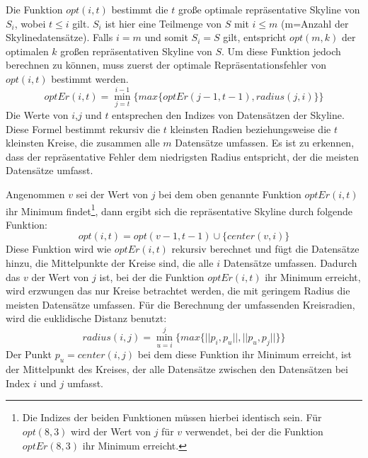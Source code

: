 Die Funktion $opt(i,t)$ bestimmt die $t$ große optimale repräsentative Skyline von $S_i$, wobei $t \leq i$ gilt. $S_i$ ist hier eine Teilmenge von $S$ mit $i \leq m$ (m=Anzahl der Skylinedatensätze). Falls $i=m$ und somit $S_i=S$ gilt, entspricht $opt(m,k)$ der optimalen $k$ großen repräsentativen Skyline von $S$.
Um diese Funktion jedoch berechnen zu können, muss zuerst der optimale Repräsentationsfehler von $opt(i,t)$ bestimmt werden.
$$optEr(i,t)=\min\limits_{j=t}^{i-1}\{max\{optEr(j-1,t-1),radius(j,i)\}\}$$
Die Werte von $i$,$j$ und $t$ entsprechen den Indizes von Datensätzen der Skyline. Diese Formel bestimmt rekursiv die $t$ kleinsten Radien beziehungsweise die $t$ kleinsten Kreise, die zusammen alle $m$ Datensätze umfassen. Es ist zu erkennen, dass der repräsentative Fehler dem niedrigsten Radius entspricht, der die meisten Datensätze umfasst.

Angenommen $v$ sei der Wert von $j$ bei dem oben genannte Funktion $optEr(i,t)$ ihr Minimum findet\footnote{Die Indizes der beiden Funktionen müssen hierbei identisch sein. Für $opt(8,3)$ wird der Wert von $j$ für $v$ verwendet, bei der die Funktion $optEr(8,3)$ ihr Minimum erreicht.}, dann ergibt sich die repräsentative Skyline durch folgende Funktion:
$$opt(i,t)=opt(v-1,t-1)\cup\{center(v,i)\}$$
Diese Funktion wird wie $optEr(i,t)$ rekursiv berechnet und fügt die Datensätze hinzu, die Mittelpunkte der Kreise sind, die alle $i$ Datensätze umfassen. Dadurch das $v$ der Wert von $j$ ist, bei der die Funktion $optEr(i,t)$ ihr Minimum erreicht, wird erzwungen das nur Kreise betrachtet werden, die mit geringem Radius die meisten Datensätze umfassen.   
Für die Berechnung der umfassenden Kreisradien, wird die euklidische Distanz benutzt:
$$radius(i,j)=\min\limits_{u=i}^{j}\{max\{||p_i,p_u||,||p_u,p_j||\}\}$$
Der Punkt $p_u=center(i,j)$ bei dem diese Funktion ihr Minimum erreicht, ist der Mittelpunkt des Kreises, der alle Datensätze zwischen den Datensätzen bei Index $i$ und $j$ umfasst.

